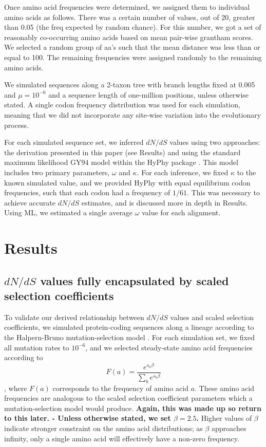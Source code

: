 \documentclass[11pt]{article}
\begin{document}
 
Once amino acid frequencies were determined, we assigned them to individual amino acids as follows. There was a certain number of values, out of 20, greater than 0.05 (the freq expected by random chance). For this number, we got a set of reasonably co-occurring amino acids based on mean pair-wise grantham scores. We selected a random group of aa's such that the mean distance was less than or equal to 100. The remaining frequencies were assigned randomly to the remaining amino acids.

We simulated sequences along a 2-taxon tree with branch lengths fixed at 0.005 and $\mu = 10^{-6}$ and a sequence length of one-million positions, unless otherwise stated. A single codon frequency distribution was used for each simulation, meaning that we did not incorporate any site-wise variation into the evolutionary process.

For each simulated sequence set, we inferred $dN/dS$ values using two approaches: the derivation presented in this paper (see Results) and using the standard maximum likelihood GY94 model \cite{GoldmanYang1994} within the HyPhy package \cite{KosakovskyPondetal2005}. This model includes two primary parameters, $\omega$ and $\kappa$. For each inference, we fixed $\kappa$ to the known simulated value, and we provided HyPhy with equal equilibrium codon frequencies, such that each codon had a frequency of $1/61$. This was necessary to achieve accurate $dN/dS$ estimates, and is discussed more in depth in Results. Using ML, we estimated a single average $\omega$ value for each alignment. 



\section*{Results}

\subsection*{$dN/dS$ values fully encapsulated by scaled selection coefficients}

To validate our derived relationship between $dN/dS$ values and scaled selection coefficients, we simulated protein-coding sequences along a lineage according to the Halpern-Bruno mutation-selection model \cite{HalpernBruno1998}. For each simulation set, we fixed all mutation rates to $10^{-6}$, and we selected steady-state amino acid frequencies according to \begin{equation} F(a) = \frac{e^{s_a\beta}}{\sum_b e^{s_b\beta}} \end{equation}, where $F(a)$ corresponds to the frequency of amino acid $a$. These amino acid frequencies are analogous to the scaled selection coefficient parameters which a mutation-selection model would produce. \textbf{Again, this was made up so return to this later. - Unless otherwise stated, we set $\beta = 2.5$.} Higher values of $\beta$ indicate stronger constraint on the amino acid distributions; as $\beta$ approaches infinity, only a single amino acid will effectively have a non-zero frequency. 
\end{document}
